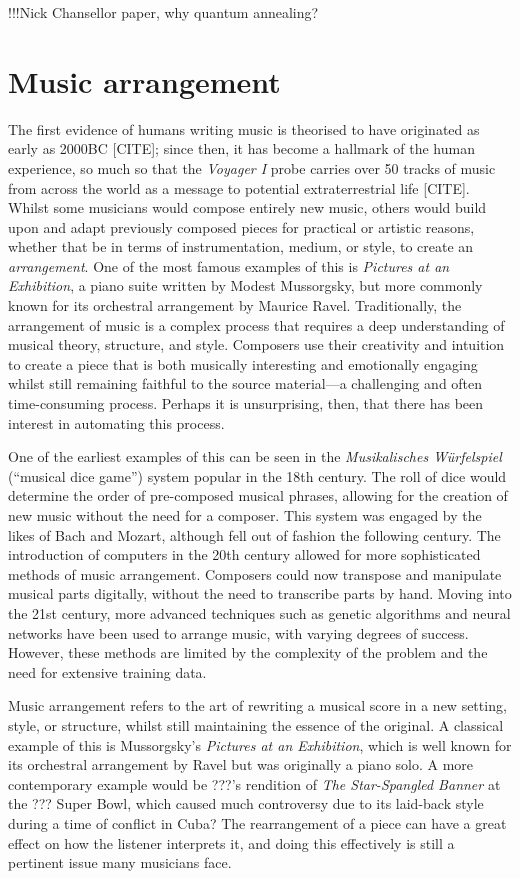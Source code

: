 \documentclass[12pt]{article}
\theoremstyle{definition}
\begin{document}
!!!Nick Chansellor paper, why quantum annealing?

\section{Music arrangement}
\label{sec:arrangement}

The first evidence of humans writing music is theorised to have originated as early as 2000BC [CITE]; since then, it has become a hallmark of the human experience, so much so that the \emph{Voyager I} probe carries over 50 tracks of music from across the world as a message to potential extraterrestrial life [CITE]. Whilst some musicians would compose entirely new music, others would build upon and adapt previously composed pieces for practical or artistic reasons, whether that be in terms of instrumentation, medium, or style, to create an \emph{arrangement}. One of the most famous examples of this is \textit{Pictures at an Exhibition}, a piano suite written by Modest Mussorgsky, but more commonly known for its orchestral arrangement by Maurice Ravel.
Traditionally, the arrangement of music is a complex process that requires a deep understanding of musical theory, structure, and style. Composers use their creativity and intuition to create a piece that is both musically interesting and emotionally engaging whilst still remaining faithful to the source material—a challenging and often time-consuming process. Perhaps it is unsurprising, then, that there has been interest in automating this process.

One of the earliest examples of this can be seen in the \textit{Musikalisches Würfelspiel} (``musical dice game'') system popular in the 18th century. The roll of dice would determine the order of pre-composed musical phrases, allowing for the creation of new music without the need for a composer. This system was engaged by the likes of Bach and Mozart, although fell out of fashion the following century.
The introduction of computers in the 20th century allowed for more sophisticated methods of music arrangement. Composers could now transpose and manipulate musical parts digitally, without the need to transcribe parts by hand. Moving into the 21st century, more advanced techniques such as genetic algorithms and neural networks have been used to arrange music, with varying degrees of success. However, these methods are limited by the complexity of the problem and the need for extensive training data.

Music arrangement refers to the art of rewriting a musical score in a new setting, style, or structure, whilst still maintaining the essence of the original. A classical example of this is Mussorgsky's \emph{Pictures at an Exhibition}, which is well known for its orchestral arrangement by Ravel but was originally a piano solo. A more contemporary example would be ???'s rendition of \emph{The Star-Spangled Banner} at the ??? Super Bowl, which caused much controversy due to its laid-back style during a time of conflict in Cuba? The rearrangement of a piece can have a great effect on how the listener interprets it, and doing this effectively is still a pertinent issue many musicians face.
\end{document}
